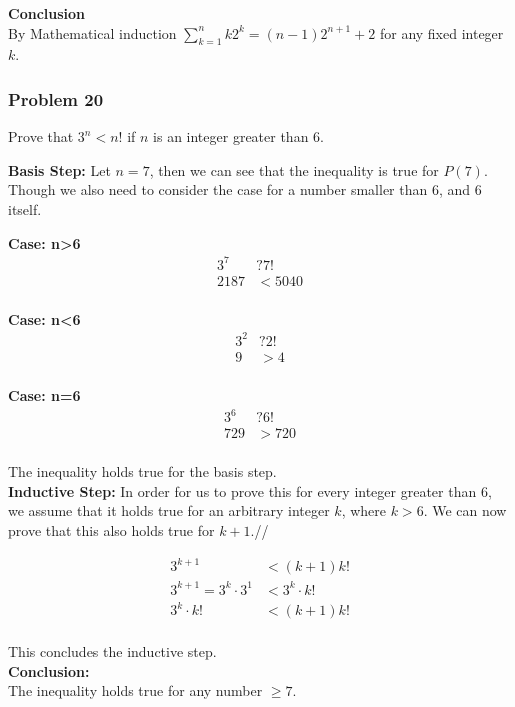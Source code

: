 \documentclass[paper=a4, fontsize=11pt]{scrartcl} %
\begin{document}
\textbf{Conclusion}\\
By Mathematical induction $\displaystyle\sum_{k=1}^{n}k2^k = (n-1)2^{n+1} + 2$ for any fixed integer $k$.\\ 
\subsubsection*{Problem 20}
Prove that $3^n<n!$ if $n$ is an integer greater than 6.

\textbf{Basis Step:}
Let $n=7$, then we can see that the inequality is true for $P(7)$. Though we also need to consider the case for a number smaller than 6, and 6 itself.

\textbf{Case: n>6}\\
\begin{align*}
3^7 &? 7!\\
2187 &< 5040\\
\end{align*}

\textbf{Case: n<6}\\
\begin{align*}
3^2 &? 2!\\
9 &> 4\\
\end{align*}

\textbf{Case: n=6}\\
\begin{align*}
3^6 &? 6!\\
729 &> 720\\
\end{align*}

The inequality holds true for the basis step.\\

\textbf{Inductive Step:}
In order for us to prove this for every integer greater than 6, we assume that it holds true for an arbitrary integer $k$, where $k>6$. We can now prove that this also holds true for $k+1$.//

\begin{align*}
3^{k+1} &< (k+1)k!\\
3^{k+1} = 3^k \cdot 3^1 &< 3^k \cdot k!\\ 
3^k \cdot k! &< (k+1)k!\\
\end{align*}

This concludes the inductive step.\\

\textbf{Conclusion:}\\
The  inequality holds true for any number $\geq 7$.\\
\end{document}
